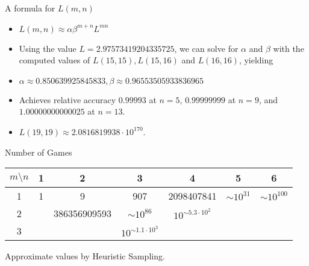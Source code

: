 \documentclass{prosper}
\begin{document}
\begin{slide}{A formula for $L(m,n)$}
\begin{itemize}
\item
$L(m,n) \approx \alpha \beta^{m+n} L^{mn}$
\item
Using the value $L=2.97573419204335725$, we can solve for $\alpha$ and
$\beta$ with the computed values of $L(15,15),L(15,16)$ and $L(16,16)$,
yielding
\item
$\alpha \approx 0.850639925845833, \beta \approx 0.96553505933836965$
\item
Achieves
relative accuracy $0.99993$ at $n=5$, $0.99999999$ at $n=9$, and
$1.00000000000025$ at $n=13$.
\item
$L(19,19) \approx 2.0816819938 \cdot 10^{170}$.
\end{itemize}
\end{slide}

\begin{slide}{Number of Games}
\begin{table}
\begin{center}
\begin{tabular}{|c||c|c|c|c|c|c|}
\hline
$m \setminus n$ & 1 & 2 & 3 & 4 & 5 & 6 \\ \hline
1 & 1 & 9 & 907 & 2098407841 & $\sim 10^{31}$ & $\sim 10^{100}$ \\
2 & & 386356909593 & $\sim 10^{86}$ & $10^{\sim 5.3\cdot 10^2}$ & & \\
3 & & & $10^{\sim 1.1\cdot 10^3}$ & & & \\
\hline
\end{tabular}
\end{center}
\end{table}
Approximate values by Heuristic Sampling.
\end{slide}
\end{document}
